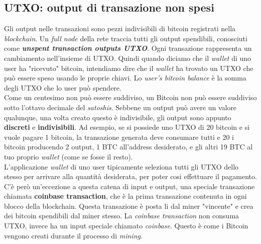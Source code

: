 \subsection{UTXO: output di transazione non spesi}
Gli output nelle transazioni sono pezzi indivisibili di bitcoin registrati nella \textit{blockchain}. Un \textit{full node} della rete traccia tutti gli output spendibili, conosciuti come \textbf{\textit{unspent transaction outputs UTXO}}. Ogni transazione rappresenta un cambiamento nell'insieme di UTXO. Quindi quando diciamo che il \textit{wallet} di uno user ha "ricevuto" bitcoin, intendiamo dire che il \textit{wallet} ha trovato un UTXO che pu\`o essere speso usando le proprie chiavi. Lo \textit{ user's bitcoin balance} \`e la somma degli UTXO che lo user pu\`o spendere.\\
Come un centesimo non pu\`o essere suddiviso, un Bitcoin non pu\`o essere suddiviso sotto l'ottavo decimale del \textit{satoshis}. Sebbene un output pu\`o avere un valore qualunque, una volta creato questo \`e indivisibile, gli output sono appunto \textbf{discreti} e \textbf{indivisibili}.
Ad esempio, se si possiede uno UTXO di 20 bitcoin e si vuole pagare 1 bitcoin, la transazione generata deve consumare tutti e 20 i bitcoin producendo 2 output, 1 BTC all'address desiderato, e gli altri 19 BTC al tuo proprio \textit{wallet} (come se fosse il resto).\\L'applicazione \textit{wallet} di uno user tipicamente seleziona tutti gli UTXO dello stesso per arrivare alla quantit\`a desiderata, per poter cosi effettuare il pagamento.\\C'\`e per\`o un'eccezione a questa catena di input e output, una speciale transazione chiamata \textbf{coinbase transaction}, che \`e la prima transazione contenuta in ogni blocco della blockchain. Questa transazione \`e posta li dal miner "vincente" e crea dei bitcoin spendibili dal miner stesso. La \textit{ coinbase transaction} non consuma UTXO, invece ha un input speciale chiamato \textit{coinbase}. Questo \`e come i Bitcoin vengono creati durante il processo di \textit{mining}.


